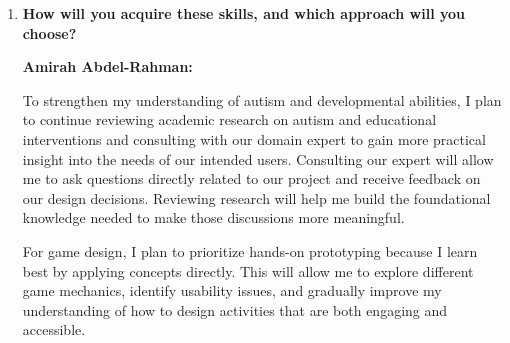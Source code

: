 \documentclass[12pt]{article}
\begin{document}
\begin{enumerate}
\textbf{Meena Al Omran:}

I have a lot to learn technically. I don't have any experience in game design,
although I've always found it interesting. It will be new to program real-time interactions
and to also consider things like enjoyability, rewards, etc. Most of my experience is
very objective-based. I also have never designed for an app before and have only worked
in web development, so that will be a new environment to work in.
I also have a ways to go with understanding the needs and experiences of autistic children,
although I do have some basic knowledge from research I've done for personal interest. Most of
my knowledge of autism is about how adults experience it. It will be new to consider a child's
point of view and how to help them. I look forward to the challenge.

\textbf{Omar Ghoneim:}

Despite having a C++ background, I am not familiar with game engines and their quirks. I am also not experienced in the field of game physics and how to draw good art or visuals in the context of gaming. This will also be my first time dealing with very sensitive data and integrating heavy privacy and security mechanisms. 

I also need to acquire the macrosystem understanding of backend engineering, with the game engine, with the frontend and the account management altogether wrapped up. I need to acquire the skill of planning a system that expansive and complex.

\item \textbf{How will you acquire these skills, and which approach will you
choose?}

\textbf{Amirah Abdel-Rahman:}

To strengthen my understanding of autism and developmental abilities, I plan to
continue reviewing academic research on autism and educational interventions and
consulting with our domain expert to gain more practical insight into the needs
of our intended users. Consulting our expert will allow me to ask questions
directly related to our project and receive feedback on our design decisions.
Reviewing research will help me build the foundational knowledge needed to make
those discussions more meaningful.

For game design, I plan to prioritize hands-on prototyping because I learn best
by applying concepts directly. This will allow me to explore different game
mechanics, identify usability issues, and gradually improve my understanding of
how to design activities that are both engaging and accessible.


\end{enumerate}
\end{document}

